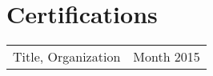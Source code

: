 \section{\sc Certifications}

\begin{tabular}{@{}p{4in}p{2in}}
Title, Organization & Month 2015\\
\end{tabular}

\endinput